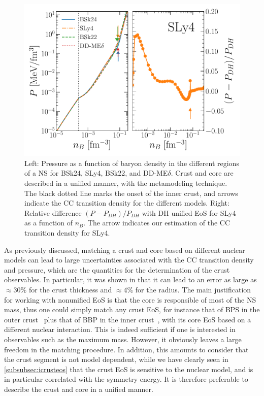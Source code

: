 \begin{figure}[!t]
\begin{center}
  \includegraphics[width=0.9\linewidth]{figures/unified.pdf}
\end{center}
\caption[Unified metamodeling of the equation of state]{Left: Pressure as a
function of baryon density in the different regions of a NS for BSk24, SLy4,
BSk22, and DD-ME$\delta$. Crust and core are described in a unified manner, 
with the metamodeling technique. The black dotted line marks the onset of the 
inner crust, and arrows indicate the CC transition density for the
different models. Right: Relative difference $(P - P_{DH})/P_{DH}$ with 
DH unified EoS for SLy4~\cite{Douchin2001} as a function 
of $n_B$. The arrow indicates our estimation of the CC transition 
density for SLy4.}\label{fig:unified}
\end{figure}

As previously discussed, matching a crust and core based on different nuclear
models can lead to large uncertainties associated with the CC transition
density and pressure, which are the quantities for the determination of the
crust observables. In particular, it was shown in \cite{Fortin2016} that it 
can lead to an error as large as $\approx 30\%$ for the crust thickness and
$\approx 4\%$ for the radius. The main justification for working with nonunified 
EoS is that the core is responsible of most of the NS mass, thus one could 
simply match any crust EoS, for instance that of BPS in the outer 
crust~\cite{BPS} plus that of BBP in the inner crust~\cite{BBP}, 
with its core EoS based on a different nuclear interaction. This is indeed 
sufficient if one is interested in observables such as the maximum mass. 
However, it obviously leaves a large freedom in the matching procedure. In 
addition, this amounts to consider that the crust segment is not model 
dependent, while we have clearly 
seen in \ref{subsubsec:icrusteos} that the crust EoS is sensitive to the 
nuclear model, and is in particular correlated with the symmetry energy. It 
is therefore preferable to describe the crust and core in a unified 
manner.

